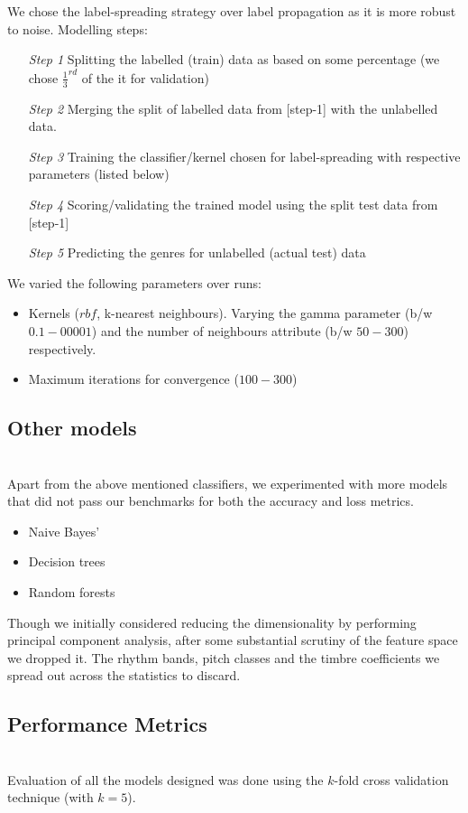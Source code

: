 \documentclass[fleqn,10pt]{SelfArx} %
\begin{document}
We chose the label-spreading strategy over label propagation as it is more robust to noise{\cite{label-spreading}}. Modelling steps:
\begin{itemize}
  \item[\textit{Step 1}] Splitting the labelled (train) data as based on some percentage (we chose $\frac{1}{3}^{rd}$ of the it for validation)
  \item[\textit{Step 2}] Merging the split of labelled data from [step-1] with the unlabelled data.
  \item[\textit{Step 3}] Training the classifier/kernel chosen for label-spreading with respective parameters (listed below)
  \item[\textit{Step 4}] Scoring/validating the trained model using the split test data from [step-1]
  \item[\textit{Step 5}] Predicting the genres for unlabelled (actual test) data
\end{itemize}

We varied the following parameters over runs:
\begin{itemize}
  \item Kernels ($rbf$, k-nearest neighbours). Varying the gamma parameter (b/w $0.1-00001$) and the number of neighbours attribute (b/w $50-300$) respectively.
  \item Maximum iterations for convergence ($100-300$)
\end{itemize}

\subsection*{Other models}~\\
Apart from the above mentioned classifiers, we experimented with more models that did not pass our benchmarks for both the accuracy and loss metrics.
\begin{itemize}
  \item Naive Bayes'
  \item Decision trees
  \item Random forests
\end{itemize}

Though we initially considered reducing the dimensionality by performing principal component analysis, after some substantial scrutiny of the feature space we dropped it. The rhythm bands, pitch classes and the timbre coefficients we spread out across the statistics to discard.

\subsection*{Performance Metrics}~\\
Evaluation of all the models designed was done using the $k$-fold cross validation technique (with $k=5$).
\end{document}
